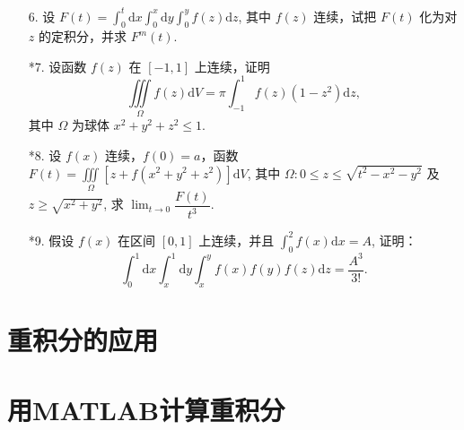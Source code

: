 \begin{enumerate}
    \item[6.] 设 $\displaystyle F(t)=\int_{0}^{t}\text{d}x\int_0^{x}\text{d}y\int_0^{y}f(z)\text{d}z$, 其中 $f(z)$ 连续，试把 $F(t)$ 化为对 $z$ 的定积分，并求 $F^{m}(t)$.
    
    \item[*7.] 设函数 $f(z)$ 在 $[-1, 1]$ 上连续，证明
    \[
        \iiint\limits_{\Omega}f(z)\text{d}V=\pi\int_{-1}^{1}f(z)(1-z^2)\text{d}z,
    \]
    其中 $\Omega$ 为球体 $x^2+y^2+z^2\leqslant 1$.

    \item[*8.] 设 $f(x)$ 连续，$f(0)=a$，函数 $F(t)=\displaystyle\iiint\limits_{\Omega}[z+f(x^2+y^2+z^2)]\text{d}V$, 其中 $\Omega : 0\leqslant z\leqslant \sqrt{t^2-x^2-y^2}$ 及 $z\geqslant \sqrt{x^2+y^2}$, 求 $\displaystyle\lim_{t\to0}\dfrac{F(t)}{t^3}$.
    
    \item[*9.] 假设 $f(x)$ 在区间 $[0, 1]$ 上连续，并且 $\displaystyle\int_0^2f(x)\text{d}x=A$, 证明：
    \[
        \int_0^1\text{d}x\int_x^1\text{d}y\int_x^yf(x)f(y)f(z)\text{d}z=\dfrac{A^3}{3!}.
    \]
\end{enumerate}


\section{重积分的应用}



\section{用MATLAB计算重积分}

